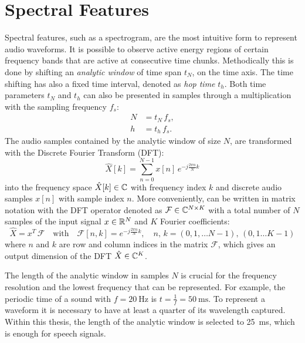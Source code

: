 
\section{Spectral Features}\label{sec:signal_spec}
\thesisStateReady
Spectral features, such as a spectrogram, are the most intuitive form to represent audio waveforms. 
It is possible to observe active energy regions of certain frequency bands that are active at consecutive time chunks.
Methodically this is done by shifting an \emph{analytic window} of time span $t_N$, on the time axis.
The time shifting has also a fixed time interval, denoted as \emph{hop time} $t_{h}$.
Both time parameters $t_N$ and $t_h$ can also be presented in samples through a multiplication with the sampling frequency $f_s$:
\begin{equation}
  \begin{split}
    N &= t_N \, f_s, \\
    h &= t_h \, f_s.
  \end{split}
\end{equation}
The audio samples contained by the analytic window of size $N$, are transformed with the Discrete Fourier Transform (DFT):
\begin{equation}\label{eq:signal_spec_dtft}
  \hat{X}[k] = \sum_{n=0}^{N-1} x[n] \, e^{-j\frac{2 \pi n}{N}k}
\end{equation}
into the frequency space $\hat{X}[k] \in \mathbb{C}$ with frequency index $k$ and discrete audio samples $x[n]$ with sample index $n$.
More conveniently,  can be written in matrix notation with the DFT operator denoted as $\mathcal{F} \in \mathbb{C}^{N \times K}$ with a total number of $N$ samples of the input signal $x \in \mathbb{R}^N$ and $K$ Fourier coefficients:
\begin{equation}\label{eq:signal_spec_dtft_matrix}
  \hat{X} = x^T \, \mathcal{F} \quad \mathrm{with} 
  \quad \mathcal{F}[n, k] = e^{-j\frac{2 \pi n}{N} k},
  \quad n,\, k = (0, 1, \dots N-1),\, (0, 1 \dots K-1)
\end{equation}
where $n$ and $k$ are row and column indices in the matrix $\mathcal{F}$, which gives an output dimension of the DFT $\hat{X} \in \mathbb{C}^K$.

The length of the analytic window in samples $N$ is crucial for the frequency resolution and the lowest frequency that can be represented.
For example, the periodic time of a sound with $f=\SI{20}{\hertz}$ is $t=\frac{1}{f} = \SI{50}{\milli\second}$.
To represent a waveform it is necessary to have at least a quarter of its wavelength captured.
Within this thesis, the length of the analytic window is selected to \SI{25}{\milli\second}, which is enough for speech signals.

